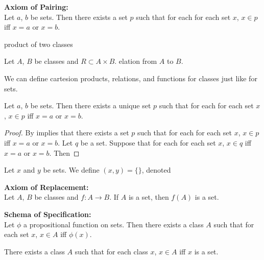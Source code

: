 \documentclass{book}
\begin{document}
	\begin{ax}  \textbf{Axiom of Pairing:}  \\
		Let $a$, $b$ be sets. Then there exists a set $p$ such that for each for each set $x$, $x \in p$ iff $x = a$ or $x = b$. 
	\end{ax}

	\begin{defn}
		product of two classes
	\end{defn}
	
	\begin{defn}
		Let $A$, $B$ be classes and $R \subset A \times B$. elation from $A$ to $B$.
	\end{defn}
	
	\begin{note}
		We can define cartesion products, relations, and functions for classes just like for sets. 
	\end{note}

	\begin{ex}
		Let $a$, $b$ be sets. Then there exists a unique set $p$ such that for each for each set $x$, $x \in p$ iff $x = a$ or $x = b$. 
	\end{ex}
	
	\begin{proof}
		By  implies that there exists a set $p$ such that for each for each set $x$, $x \in p$ iff $x = a$ or $x = b$. Let $q$ be a set. Suppose that for each for each set $x$, $x \in q$ iff $x = a$ or $x = b$. Then  
	\end{proof}

	\begin{defn}
		Let $x$ and $y$ be sets. We define $(x,y) = \{\}$, denoted 
	\end{defn}
	
	\begin{ax}  \textbf{Axiom of Replacement:}  \\
		Let $A$, $B$ be classes and $f:A \rightarrow B$. If $A$ is a set, then $f(A)$ is a set. 
	\end{ax}

	\begin{ax}  \textbf{Schema of Specification:}  \\
		Let $\phi$ a propositional function on sets. Then there exists a class $A$ such that for each set $x$, $x \in A$ iff $\phi(x)$. 
	\end{ax}
	
	\begin{ex} 
		There exists a class $A$ such that for each class $x$, $x \in A$ iff $x$ is a set.
	\end{ex}
	
\end{document}
